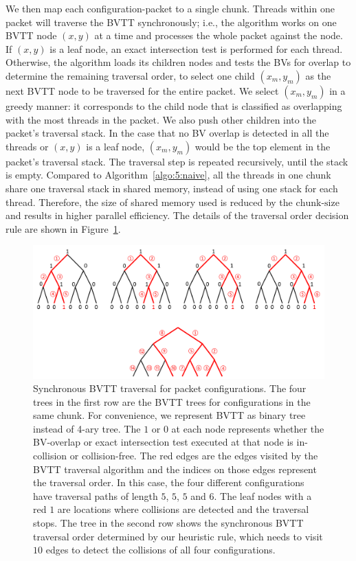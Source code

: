 We then map each configuration-packet to a single chunk. Threads within one packet will traverse the BVTT synchronously; i.e., the algorithm works on one BVTT node $(x, y)$ at a time and processes the whole packet against the node. If $(x,y)$ is a leaf node, an exact intersection test is performed for each thread. Otherwise, the algorithm loads its children nodes and tests the BVs for overlap to determine the remaining traversal order, to select one child $(x_m, y_m)$ as the next BVTT node to be traversed for the entire packet. We select $(x_m, y_m)$ in a greedy manner: it corresponds to the child node that is classified as overlapping with the most threads in the packet. We also push other children into the packet's traversal stack. In the case that no BV overlap is detected in all the
threads or $(x,y)$ is a leaf node, $(x_m, y_m)$ would be the top element in the packet's traversal stack.  The traversal
step is repeated recursively, until the stack is empty. Compared to Algorithm~\ref{algo:5:naive}, all the threads in one chunk share one
traversal stack in shared memory, instead of using one stack for each thread. Therefore, the size of shared memory used
is reduced by the $\text{chunk-size}$ and results in higher parallel efficiency. The details of the traversal order decision rule are shown in Figure~\ref{fig:5:packettraverse}.

\begin{figure}[!htb]
  \centering
  \includegraphics[width=\linewidth]{figs/5/packettraverse.pdf}
  \caption[Synchronous BVTT traversal for packet configurations]{Synchronous BVTT traversal for packet configurations. The four trees in the first row are the BVTT trees for configurations in the same chunk. For convenience, we represent BVTT as binary tree instead of 4-ary tree. The $1$ or $0$ at each node represents whether the BV-overlap or exact intersection test executed at that node is in-collision or collision-free. The red edges are the edges visited by the BVTT traversal algorithm and the indices on those edges
  represent the traversal order. In this case, the four different configurations have traversal paths of length $5$, $5$, $5$ and $6$. The leaf nodes with a red $1$ are locations where collisions are detected and the traversal stops.
  The tree in the second row shows the synchronous BVTT traversal order determined by our heuristic rule, which needs to visit $10$ edges to detect the collisions of all four configurations.}
  \label{fig:5:packettraverse}
\end{figure}

